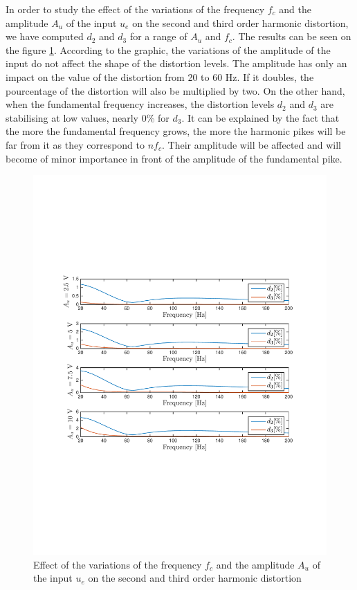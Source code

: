 In order to study the effect of the variations of the frequency $f_c$ and the amplitude $A_u$ of the input $u_e$ on the second and third order harmonic distortion, we have computed $d_2$ and $d_3$ for a range of $A_u$ and $f_c$. The results can be seen on the figure \ref{fig:d2d3}. According to the graphic, the variations of the amplitude of the input do not affect the shape of the distortion levels. The amplitude has only an impact on the value of the distortion from 20 to 60 Hz. If it doubles, the pourcentage of the distortion will also be multiplied by two. On the other hand, when the fundamental frequency increases, the distortion levels $d_2$ and $d_3$ are stabilising at low values, nearly 0\% for $d_3$. It can be explained by the fact that the more the fundamental frequency grows, the more the harmonic pikes will be far from it as they correspond to $nf_c$. Their amplitude will be affected and will become of minor importance in front of the amplitude of the fundamental pike.

\begin{figure}[H]
 \centering 
 \includegraphics[trim=2cm 7cm 2cm 7cm, clip=true, totalheight=0.35\textheight, angle=0]{figures/P5d2d3.pdf}
 \caption{Effect of the variations of the frequency $f_c$ and the amplitude $A_u$ of the input $u_e$ on the second and third order harmonic distortion}
 \label{fig:d2d3}
\end{figure}